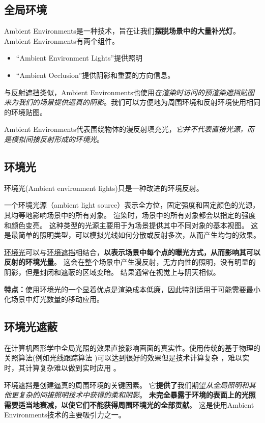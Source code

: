 \documentclass[UTF8,a4paper,12pt]{ctexbook}
\begin{document}
		\subsection{全局环境}
			Ambient Environments是一种技术，旨在让我们\textbf{摆脱场景中的大量补光灯}。Ambient Environments有两个组件。
			\begin{itemize}
				\item “Ambient Environment Lights”提供照明
				\item “Ambient Occlusion”提供阴影和重要的方向信息。
			\end{itemize}
			
			与\underline{反射遮挡}类似，Ambient Environments也使用\textit{在渲染时访问的预渲染遮挡贴图来为我们的场景提供逼真的阴影}。我们可以方便地为周围环境和反射环境使用相同的环境贴图。
			
			Ambient Environments代表围绕物体的漫反射填充光，\textit{它并不代表直接光源，而是模拟间接反射形成的环境光}。
		
		
		\subsection{环境光}
			环境光(Ambient environment lights)只是一种改进的环境反射。
		
			一个环境光源（ambient light source）表示全方位，固定强度和固定颜色的光源，其均等地影响场景中的所有对象。 渲染时，场景中的所有对象都会以指定的强度和颜色变亮。 这种类型的光源主要用于为场景提供其中不同对象的基本视图。 这是最简单的照明类型，可以模拟光线如何分散或反射多次，从而产生均匀的效果。
			
			\underline{环境光}可以与\underline{环境遮挡}相结合，\textbf{以表示场景中每个点的曝光方式，从而影响其可以反射的环境光量}。 这会在整个场景中产生漫反射，无方向性的照明，没有明显的阴影，但是封闭和遮蔽的区域变暗。 结果通常在视觉上与阴天相似。
			
			\textbf{特点：}使用环境光的一个显着优点是渲染成本低廉，因此特别适用于可能需要最小化场景中灯光数量的移动应用。
			
		\subsection{环境光遮蔽}
			在计算机图形学中全局光照的效果直接影响画面的真实性。使用传统的基于物理的关照算法(例如光线跟踪算法 )可以达到很好的效果但是技术计算复杂 ，难以实时，其计算复杂难以做到实时应用 。
			
			环境遮挡是创建逼真的周围环境的关键因素。 它\textbf{提供了}我们期望\textit{从全局照明和其他更复杂的间接照明技术中获得的柔和阴影}。 \textbf{未完全暴露于环境的表面上的光照需要适当地衰减，以使它们不能获得周围环境光的全部贡献}。 这是使用Ambient Environments技术的主要吸引力之一。
			
\end{document}

